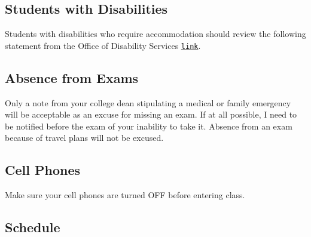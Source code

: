 \documentclass[letterpaper]{article}
\begin{document}
\subsection*{Students with Disabilities}
Students with disabilities who require accommodation should review the following statement from the Office of Disability Services \href{https://ods.rutgers.edu/faculty/syllabus}{\texttt{link}}.


\subsection*{Absence from Exams}

Only a note from your college dean stipulating a medical or family emergency will be acceptable as an excuse for missing an exam. If at all possible, I need to be notified before the exam of your inability to take it. Absence from an exam because of travel plans will not be excused.

\subsection*{Cell Phones} 

Make sure your cell phones are turned OFF before entering class.


\subsection*{Schedule}
\end{document}
